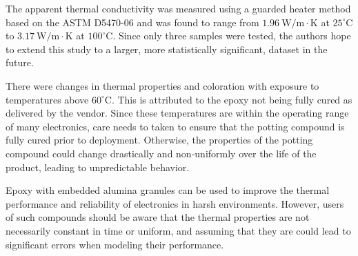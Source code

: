 The apparent thermal conductivity was measured using a guarded heater method based on the ASTM D5470-06 and was found to range from \(1.96\:\mathrm{W/m\cdot K}\) at \(25^{\circ}\mathrm{C}\) to \(3.17\:\mathrm{W/m\cdot K}\) at \(100^{\circ}\mathrm{C}\).  Since only three samples were tested, the authors hope to extend this study to a larger, more statistically significant, dataset in the future.

There were changes in thermal properties and coloration with exposure to temperatures above \(60^{\circ}\mathrm{C}\).  This is attributed to the epoxy not being fully cured as delivered by the vendor.  Since these temperatures are within the operating range of many electronics, care needs to taken to ensure that the potting compound is fully cured prior to deployment.  Otherwise, the properties of the potting compound could change drastically and non-uniformly over the life of the product, leading to unpredictable behavior.

Epoxy with embedded alumina granules can be used to improve the thermal performance and reliability of electronics in harsh environments.  However, users of such compounds should be aware that the thermal properties are not necessarily constant in time or uniform, and assuming that they are could lead to significant errors when modeling their performance.

